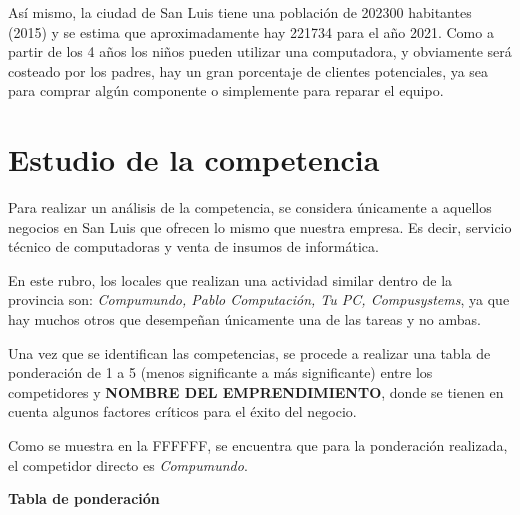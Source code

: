 \documentclass[11pt,a4paper]{article}
\begin{document}
Así mismo, la ciudad de San Luis tiene una población de 202300 habitantes (2015) y se estima que aproximadamente hay 221734 para el año 2021. Como a partir de los 4 años los niños pueden utilizar una computadora, y obviamente será costeado por los padres, hay un gran porcentaje de clientes potenciales, ya sea para comprar algún componente o simplemente para reparar el equipo.

\section{Estudio de la competencia}
Para realizar un análisis de la competencia, se considera únicamente a aquellos negocios en San Luis que ofrecen lo mismo que nuestra empresa. Es decir, servicio técnico de computadoras y venta de insumos de informática. 

En este rubro, los locales que realizan una actividad similar dentro de la provincia son: \textit{Compumundo, Pablo Computación, Tu PC, Compusystems}, ya que hay muchos otros que desempeñan únicamente una de las tareas y no ambas.

Una vez que se identifican las competencias, se procede a realizar una tabla de ponderación de 1 a 5 (menos significante a más significante) entre los competidores y \textbf{NOMBRE DEL EMPRENDIMIENTO}, donde se tienen en cuenta algunos factores críticos para el éxito del negocio.



Como se muestra en la FFFFFF, se encuentra que para la ponderación realizada, el competidor directo es \textit{Compumundo}.

\textbf{Tabla de ponderación}

\end{document}
